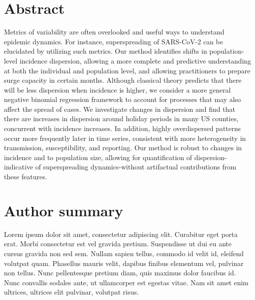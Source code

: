 \documentclass[10pt,letterpaper]{article}
\begin{document}
\section*{Abstract}
Metrics of variability are often overlooked and useful ways to understand epidemic dynamics. 
For instance, superspreading of SARS-CoV-2 can be elucidated by utilizing such metrics. Our method identifies shifts in population-level incidence dispersion, allowing a more complete and predictive understanding at both the individual and population level, and allowing practitioners to prepare surge capacity in certain months. 
Although classical theory predicts that there will be less dispersion when incidence is higher, we consider a more general negative binomial regression framework to account for processes that may also affect the spread of cases. 
We investigate changes in dispersion and find that there are increases in dispersion around holiday periods in many US counties, concurrent with incidence increases. 
In addition, highly overdispersed patterns occur more frequently later in time series, consistent with more heterogeneity in transmission, susceptibility, and reporting. 
Our method is robust to changes in incidence and to population size, allowing for quantification of dispersion-indicative of superspreading dynamics-without artifactual contributions from these features.


\section*{Author summary}
Lorem ipsum dolor sit amet, consectetur adipiscing elit. Curabitur eget porta erat. 
Morbi consectetur est vel gravida pretium. 
Suspendisse ut dui eu ante cursus gravida non sed sem. Nullam sapien tellus, commodo id velit id, eleifend volutpat quam. 
Phasellus mauris velit, dapibus finibus elementum vel, pulvinar non tellus. 
Nunc pellentesque pretium diam, quis maximus dolor faucibus id. 
Nunc convallis sodales ante, ut ullamcorper est egestas vitae. 
Nam sit amet enim ultrices, ultrices elit pulvinar, volutpat risus.

\linenumbers

\end{document}
